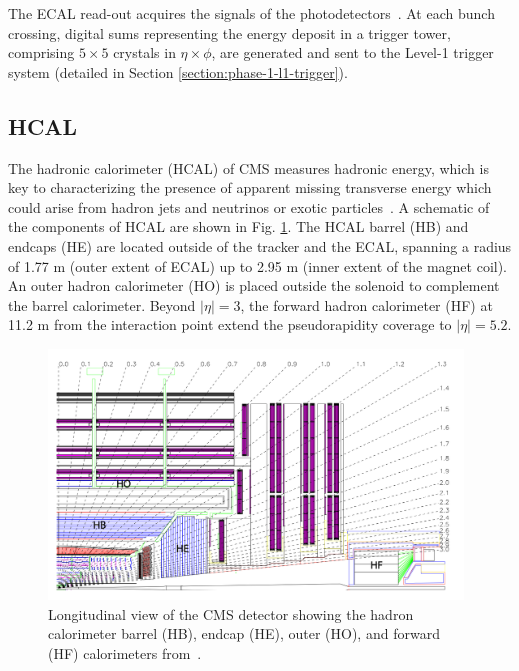 The ECAL read-out acquires the signals of the photodetectors~\cite{CMS-2008-JINST-3-S08004}. At each bunch crossing, digital sums representing the energy deposit in a trigger tower, comprising $5 \times 5$ crystals in $\eta \times \phi$, are generated and sent to the Level-1 trigger system (detailed in Section \ref{section:phase-1-l1-trigger}).

\subsection{HCAL}
The hadronic calorimeter (HCAL) of CMS measures hadronic energy, which is key to characterizing the presence of apparent missing transverse energy which could arise from hadron jets and neutrinos or exotic particles~\cite{CMS-2008-JINST-3-S08004}. A schematic of the components of HCAL are shown in Fig. \ref{fig:phase-1-HCAL-schematic}. The HCAL barrel (HB) and endcaps (HE) are located outside of the tracker and the ECAL, spanning a radius of 1.77 m (outer extent of ECAL) up to 2.95 m (inner extent of the magnet coil). An outer hadron calorimeter (HO) is placed outside the solenoid to complement the barrel calorimeter. Beyond $|\eta| = 3$, the forward hadron calorimeter (HF) at 11.2 m from the interaction point extend the pseudorapidity coverage to $|\eta| = 5.2$.

\begin{figure}[ht]
    \centering
    \includegraphics[width=11cm]{figures/ch-2-cern-cms/phase-1-HCAL-schematic.png}
    \caption[Longitudinal view of the CMS detector showing the hadron calorimeter barrel (HB), endcap (HE), outer (HO), and forward (HF) calorimeters.]{Longitudinal view of the CMS detector showing the hadron calorimeter barrel (HB), endcap (HE), outer (HO), and forward (HF) calorimeters from~\cite{CMS-2008-JINST-3-S08004}.}
    \label{fig:phase-1-HCAL-schematic}
\end{figure}

